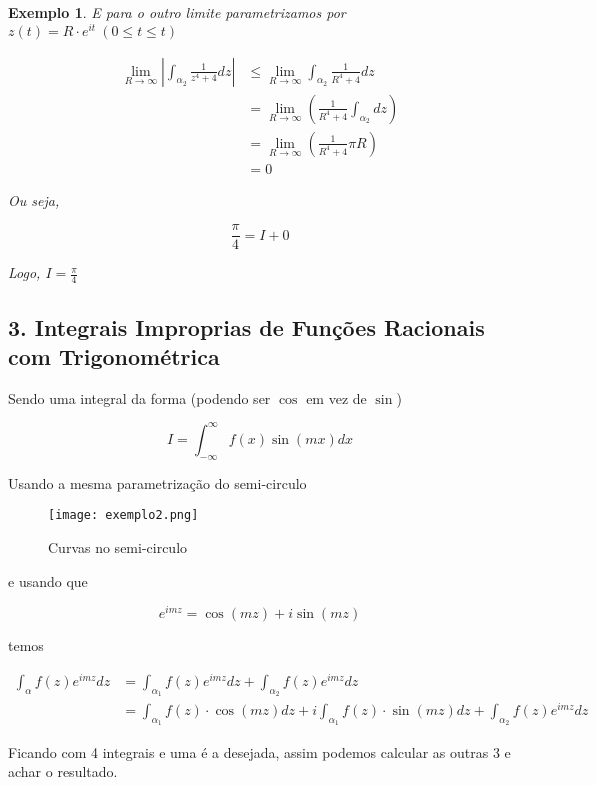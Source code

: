 \documentclass{article}
\newtheorem{ex}{Exemplo}
\begin{document}
\begin{ex}
E para o outro limite parametrizamos por $z(t) = R \cdot e^{i t}\ (0 \leq t \leq t)$

\begin{align*}
    \lim_{R \to \infty} \left| \int_{\alpha_2} \frac{1}{z^4 + 4}d z \right| &\leq \lim_{R \to \infty} \int_{\alpha_2} \frac{1}{R^4 + 4}d z \\
    &= \lim_{R \to \infty} \left( \frac{1}{R^4 + 4} \int_{\alpha_2} d z \right) \\
    &= \lim_{R \to \infty} \left( \frac{1}{R^4 + 4} \pi R \right) \\
    &= 0
\end{align*}

Ou seja,

$$\frac{\pi}{4} = I + 0$$

Logo, $I = \frac{\pi}{4}$
\end{ex}

\subsection*{3. Integrais Improprias de Funções Racionais com Trigonométrica}
Sendo uma integral da forma (podendo ser $\cos$ em vez de $\sin$)

\begin{equation*}
    I = \int_{- \infty}^\infty f(x) \sin(m x) d x
\end{equation*}

Usando a mesma parametrização do semi-circulo 

\begin{figure}[H]
    \centering
    \texttt{[image: exemplo2.png]}
    \caption{Curvas no semi-circulo}
    \label{fig:ex2}
\end{figure}

e usando que

\begin{equation*}
    e^{i m z} = \cos(m z) + i \sin(m z)
\end{equation*}

temos

\begin{align*}
    \int_\alpha f(z) e^{imz} d z &= \int_{\alpha_1} f(z) e^{imz} d z + \int_{\alpha_2} f(z) e^{imz} d z \\
    &= \int_{\alpha_1} f(z) \cdot \cos(mz) d z + i \int_{\alpha_1} f(z) \cdot \sin(mz) d z + \int_{\alpha_2} f(z) e^{imz} d z
\end{align*}

Ficando com 4 integrais e uma é a desejada, assim podemos calcular as outras 3 e achar o resultado.
\end{document}
